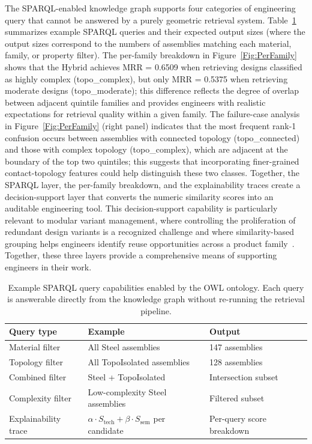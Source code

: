 \documentclass[preprint,12pt]{elsarticle}
\begin{document}
The SPARQL-enabled knowledge graph supports four categories of engineering query that cannot be answered by a purely geometric retrieval system.
Table~\ref{tab:SPARQL} summarizes example SPARQL queries and their expected output sizes (where the output sizes correspond to the numbers of assemblies matching each material, family, or property filter).
The per-family breakdown in Figure~\ref{Fig:PerFamily} shows that the Hybrid achieves MRR = 0.6509 when retrieving designs classified as highly complex (topo\_complex), but only MRR = 0.5375 when retrieving moderate designs (topo\_moderate); this difference reflects the degree of overlap between adjacent quintile families and provides engineers with realistic expectations for retrieval quality within a given family.
The failure-case analysis in Figure~\ref{Fig:PerFamily} (right panel) indicates that the most frequent rank-1 confusion occurs between assemblies with connected topology (topo\_connected) and those with complex topology (topo\_complex), which are adjacent at the boundary of the top two quintiles; this suggests that incorporating finer-grained contact-topology features could help distinguish these two classes.
Together, the SPARQL layer, the per-family breakdown, and the explainability traces create a decision-support layer that converts the numeric similarity scores into an auditable engineering tool.
This decision-support capability is particularly relevant to modular variant management, where controlling the proliferation of redundant design variants is a recognized challenge and where similarity-based grouping helps engineers identify reuse opportunities across a product family~\cite{Oh2023}.
Together, these three layers provide a comprehensive means of supporting engineers in their work.

\begin{table}[!ht]
\centering
\caption{Example SPARQL query capabilities enabled by the OWL ontology. Each query is answerable directly from the knowledge graph without re-running the retrieval pipeline.}
\label{tab:SPARQL}
\begin{tabular}{lll}
\toprule
\textbf{Query type} & \textbf{Example} & \textbf{Output} \\
\midrule
Material filter & All Steel assemblies & 147 assemblies \\
Topology filter & All TopoIsolated assemblies & 128 assemblies \\
Combined filter & Steel + TopoIsolated & Intersection subset \\
Complexity filter & Low-complexity Steel assemblies & Filtered subset \\
Explainability trace & $\alpha{\cdot}S_{\text{tech}} + \beta{\cdot}S_{\text{sem}}$ per candidate & Per-query score breakdown \\
\bottomrule
\end{tabular}
\end{table}
\end{document}
